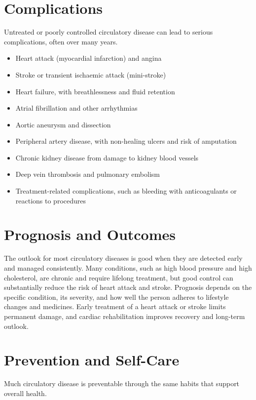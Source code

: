 \section*{Complications}
Untreated or poorly controlled circulatory disease can lead to serious complications, often over many years.

\begin{itemize}
    \item Heart attack (myocardial infarction) and angina
    \item Stroke or transient ischaemic attack (mini-stroke)
    \item Heart failure, with breathlessness and fluid retention
    \item Atrial fibrillation and other arrhythmias
    \item Aortic aneurysm and dissection
    \item Peripheral artery disease, with non-healing ulcers and risk of amputation
    \item Chronic kidney disease from damage to kidney blood vessels
    \item Deep vein thrombosis and pulmonary embolism
    \item Treatment-related complications, such as bleeding with anticoagulants or reactions to procedures
\end{itemize}

\section*{Prognosis and Outcomes}
The outlook for most circulatory diseases is good when they are detected early and managed consistently. Many conditions, such as high blood pressure and high cholesterol, are chronic and require lifelong treatment, but good control can substantially reduce the risk of heart attack and stroke. Prognosis depends on the specific condition, its severity, and how well the person adheres to lifestyle changes and medicines. Early treatment of a heart attack or stroke limits permanent damage, and cardiac rehabilitation improves recovery and long-term outlook.

\section*{Prevention and Self-Care}
Much circulatory disease is preventable through the same habits that support overall health.

